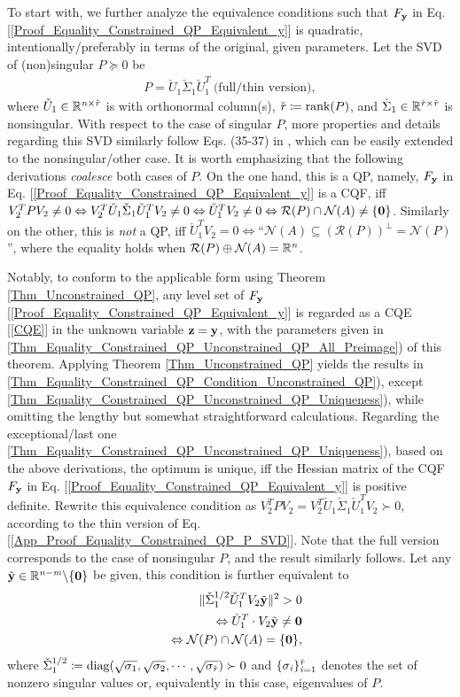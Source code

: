 \documentclass[9pt,twocolumn,twoside,lineno]{pnas-new-1}
\newcommand{\beq}{\begin{eqnarray}}
\newcommand{\eeq}{\end{eqnarray}}
\newcommand{\bfy}{{\bf y}}
\newcommand{\bfz}{{\bf z}}
\newcommand{\bfzero}{{\bf 0}}
\newcommand{\real}{\mathbb{R}}
\newcommand{\calN}{{\mathcal N}}
\newcommand{\calR}{{\mathcal R}}
\newcommand{\iti}{{\it i}}
\newcommand{\itm}{{\it m}}
\newcommand{\itn}{{\it n}}
\newcommand{\itr}{{\it r}}
\theoremstyle{remark}
\begin{document}
To start with, we further analyze the equivalence conditions such that $F_\bfy$ in Eq. [\ref{Proof_Equality_Constrained_QP_Equivalent_y}] is quadratic, intentionally/preferably in terms of the original, given parameters. Let the SVD of (non)singular $P\succeq 0$ be
\beq
P=\check U_1\check\Sigma_1\check U_1^T~\mbox{(full/thin version)},
\label{App_Proof_Equality_Constrained_QP_P_SVD}
\eeq
where $\check U_1\in\real^{{\it n}\times {\check{\it r}}}$ is with orthonormal column(s), $\check\itr\coloneqq\mbox{rank}(P)$, and $\check\Sigma_1\in\real^{{\check\itr}\times {\check\itr}}$ is nonsingular. With respect to the case of singular $P$, more properties and details regarding this SVD similarly follow Eqs. (35-37) in \cite{LiLiHs:20}, which can be easily extended to the nonsingular/other case. It is worth emphasizing that the following derivations \textit{coalesce} both cases of $P$. On the one hand, this is a QP, namely, $F_\bfy$ in Eq. [\ref{Proof_Equality_Constrained_QP_Equivalent_y}] is a CQF, iff $V_2^TPV_2\ne 0\Leftrightarrow V_2^T\check U_1\check \Sigma_1\check U_1^TV_2\ne 0\Leftrightarrow \check U_1^T V_2\ne 0\Leftrightarrow \calR(P)\cap\calN(A)\ne\{\bfzero\}$. Similarly on the other, this is \textit{not} a QP, iff $\check U_1^T V_2=0\Leftrightarrow \mbox{``}\calN(A)\subseteq(\calR(P))^\perp=\calN(P)$'', where the equality holds when $\calR(P)\oplus\calN(A)=\real^\itn$.

Notably, to conform to the applicable form using Theorem \ref{Thm_Unconstrained_QP}, any level set of $F_\bfy$ [\ref{Proof_Equality_Constrained_QP_Equivalent_y}] is regarded as a CQE [\ref{CQE}] in the unknown variable $\bfz=\bfy$, with the parameters given in \ref{Thm_Equality_Constrained_QP_Unconstrained_QP_All_Preimage}) of this theorem. Applying Theorem \ref{Thm_Unconstrained_QP} yields the results in \ref{Thm_Equality_Constrained_QP_Condition_Unconstrained_QP}), except \ref{Thm_Equality_Constrained_QP_Unconstrained_QP_Uniqueness}), while omitting the lengthy but somewhat straightforward calculations. Regarding the exceptional/last one \ref{Thm_Equality_Constrained_QP_Unconstrained_QP_Uniqueness}), based on the above derivations, the optimum is unique, iff the Hessian matrix of the CQF $F_\bfy$ in Eq. [\ref{Proof_Equality_Constrained_QP_Equivalent_y}] is positive definite. Rewrite this equivalence condition as $V_2^TPV_2=V_2^T\check U_1\check\Sigma_1\check U_1^TV_2\succ 0$, according to the thin version of Eq. [\ref{App_Proof_Equality_Constrained_QP_P_SVD}]. Note that the full version corresponds to the case of nonsingular $P$, and the result similarly follows. Let any $\tilde\bfy\in\real^{\itn-\itm}\backslash\{\bfzero\}$ be given, this condition is further equivalent to
\beq
&&\Vert\check\Sigma_1^{1/2}\check U_1^TV_2\tilde\bfy\Vert^2>0\nonumber\\
&&\Leftrightarrow\check U_1^T\cdot V_2\tilde\bfy\ne\bfzero\nonumber\\
&&\Leftrightarrow\calN(P)\cap\calN(A)=\{\bfzero\},\nonumber
\eeq
where $\check\Sigma_1^{1/2}\coloneqq\mbox{diag}(\sqrt{\sigma_1},\sqrt{\sigma_2},\cdots,\sqrt{\sigma_{\check\itr}})\succ 0$ and $\{\sigma_\iti\}_{\iti=1}^{\check\itr}$ denotes the set of nonzero singular values or, equivalently in this case, eigenvalues of $P$.
\end{document}
